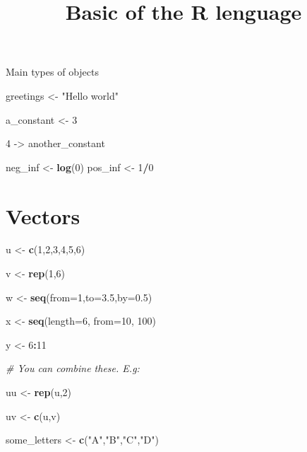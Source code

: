 \documentclass[]{article}
\title{Basic of the R lenguage}
\author{}
\date{}
\newenvironment{Shaded}{\begin{snugshade}}{\end{snugshade}}
\newcommand{\KeywordTok}[1]{\textcolor[rgb]{0.13,0.29,0.53}{\textbf{#1}}}
\newcommand{\DataTypeTok}[1]{\textcolor[rgb]{0.13,0.29,0.53}{#1}}
\newcommand{\DecValTok}[1]{\textcolor[rgb]{0.00,0.00,0.81}{#1}}
\newcommand{\FloatTok}[1]{\textcolor[rgb]{0.00,0.00,0.81}{#1}}
\newcommand{\StringTok}[1]{\textcolor[rgb]{0.31,0.60,0.02}{#1}}
\newcommand{\CommentTok}[1]{\textcolor[rgb]{0.56,0.35,0.01}{\textit{#1}}}
\newcommand{\OperatorTok}[1]{\textcolor[rgb]{0.81,0.36,0.00}{\textbf{#1}}}
\newcommand{\NormalTok}[1]{#1}
\begin{document}
\maketitle

Main types of objects

\begin{Shaded}
\begin{Highlighting}[]
\NormalTok{greetings <-}\StringTok{ "Hello world"} 


\NormalTok{a_constant <-}\StringTok{ }\DecValTok{3}

\DecValTok{4}\NormalTok{ ->}\StringTok{ }\NormalTok{another_constant}

\NormalTok{neg_inf <-}\StringTok{ }\KeywordTok{log}\NormalTok{(}\DecValTok{0}\NormalTok{)}
\NormalTok{pos_inf <-}\StringTok{ }\DecValTok{1}\OperatorTok{/}\DecValTok{0}
\end{Highlighting}
\end{Shaded}

\section{Vectors}\label{vectors}

\begin{Shaded}
\begin{Highlighting}[]
\NormalTok{u <-}\StringTok{ }\KeywordTok{c}\NormalTok{(}\DecValTok{1}\NormalTok{,}\DecValTok{2}\NormalTok{,}\DecValTok{3}\NormalTok{,}\DecValTok{4}\NormalTok{,}\DecValTok{5}\NormalTok{,}\DecValTok{6}\NormalTok{)}

\NormalTok{v <-}\StringTok{ }\KeywordTok{rep}\NormalTok{(}\DecValTok{1}\NormalTok{,}\DecValTok{6}\NormalTok{)}

\NormalTok{w <-}\StringTok{ }\KeywordTok{seq}\NormalTok{(}\DataTypeTok{from=}\DecValTok{1}\NormalTok{,}\DataTypeTok{to=}\FloatTok{3.5}\NormalTok{,}\DataTypeTok{by=}\FloatTok{0.5}\NormalTok{)}

\NormalTok{x <-}\StringTok{ }\KeywordTok{seq}\NormalTok{(}\DataTypeTok{length=}\DecValTok{6}\NormalTok{, }\DataTypeTok{from=}\DecValTok{10}\NormalTok{, }\DecValTok{100}\NormalTok{)}

\NormalTok{y <-}\StringTok{ }\DecValTok{6}\OperatorTok{:}\DecValTok{11}
\end{Highlighting}
\end{Shaded}

\begin{Shaded}
\begin{Highlighting}[]
\CommentTok{# You can combine these. E.g:}

\NormalTok{uu <-}\StringTok{ }\KeywordTok{rep}\NormalTok{(u,}\DecValTok{2}\NormalTok{)}

\NormalTok{uv <-}\StringTok{ }\KeywordTok{c}\NormalTok{(u,v)}

\NormalTok{some_letters <-}\StringTok{ }\KeywordTok{c}\NormalTok{(}\StringTok{"A"}\NormalTok{,}\StringTok{"B"}\NormalTok{,}\StringTok{"C"}\NormalTok{,}\StringTok{"D"}\NormalTok{)}
\end{Highlighting}
\end{Shaded}
\end{document}
